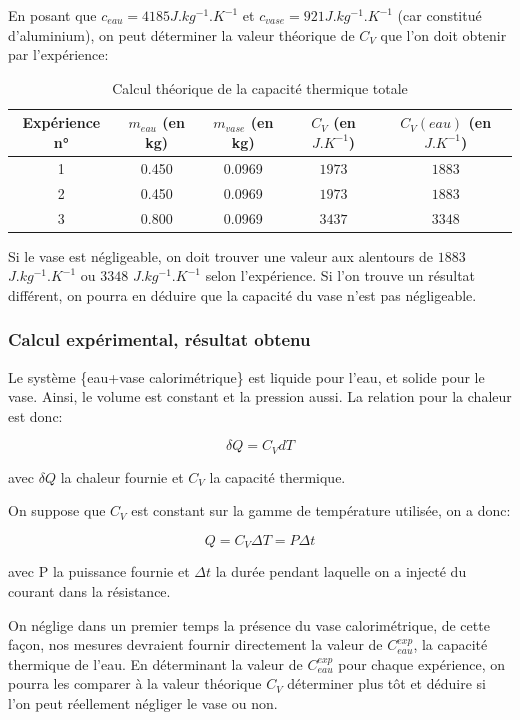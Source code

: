 \documentclass[12pt]{article}
\begin{document}
En posant que $c_{eau} = 4185 J.kg^{-1}.K^{-1}$ et $c_{vase} = 921 J.kg^{-1}.K^{-1}$ (car constitué d'aluminium), on peut déterminer la valeur théorique de $C_V$ que l'on doit obtenir par l'expérience:

\begin{table}[h!]
	\begin{center}
		\begin{tabular}{|c|c|c|c|c|}
			\hline
			Expérience n° & $m_{eau}$ (en kg) & $m_{vase}$ (en kg) & $C_V$ (en $J.K^{-1}$) & $C_V(eau)$ (en $J.K^{-1}$)\\ \hline
			1 & 0.450 & 0.0969 & $1973$ & $1883$ \\
			2 & 0.450 & 0.0969 & $1973$ & $1883$ \\
			3 & 0.800 & 0.0969 & $3437$ & $3348$ \\ \hline
		\end{tabular}
	\end{center}
	\caption{Calcul théorique de la capacité thermique totale}
\end{table}

Si le vase est négligeable, on doit trouver une valeur aux alentours de $1883$ $J.kg^{-1}.K^{-1}$ ou $3348$ $J.kg^{-1}.K^{-1}$ selon l'expérience. Si l'on trouve un résultat différent, 
on pourra en déduire que la capacité du vase n'est pas négligeable.

\subsubsection{Calcul expérimental, résultat obtenu}
Le système \{eau+vase calorimétrique\} est liquide pour l'eau, et solide pour le vase.
Ainsi, le volume est constant et la pression aussi. La relation pour la chaleur est donc:

\begin{equation}
\delta Q=C_VdT
\end{equation}

avec $\delta Q$ la chaleur fournie et $C_V$ la capacité thermique. 

On suppose que $C_V$ est constant sur la gamme de température utilisée, on a donc:

\begin{equation}
Q = C_V\Delta T = P\Delta t
\end{equation}

avec P la puissance fournie et $\Delta t$ la durée pendant laquelle on a injecté du courant dans la résistance.

On néglige dans un premier temps la présence du vase calorimétrique, de cette façon, nos mesures devraient fournir directement la valeur de $C_{eau}^{exp}$, la capacité thermique de l'eau.
En déterminant la valeur de $C_{eau}^{exp}$ pour chaque expérience, on pourra les comparer à la valeur théorique $C_V$ déterminer plus tôt et déduire si l'on peut réellement négliger le vase ou non.
\end{document}
